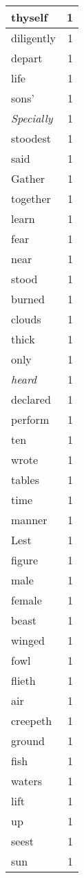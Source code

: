 \begin{center}
\begin{longtable}{l|r}
thyself & 1 \\ \hline
diligently & 1 \\ \hline
depart & 1 \\ \hline
life & 1 \\ \hline
sons' & 1 \\ \hline
\emph{Specially} & 1 \\ \hline
stoodest & 1 \\ \hline
said & 1 \\ \hline
Gather & 1 \\ \hline
together & 1 \\ \hline
learn & 1 \\ \hline
fear & 1 \\ \hline
near & 1 \\ \hline
stood & 1 \\ \hline
burned & 1 \\ \hline
clouds & 1 \\ \hline
thick & 1 \\ \hline
only & 1 \\ \hline
\emph{heard} & 1 \\ \hline
declared & 1 \\ \hline
perform & 1 \\ \hline
ten & 1 \\ \hline
wrote & 1 \\ \hline
tables & 1 \\ \hline
time & 1 \\ \hline
manner & 1 \\ \hline
Lest & 1 \\ \hline
figure & 1 \\ \hline
male & 1 \\ \hline
female & 1 \\ \hline
beast & 1 \\ \hline
winged & 1 \\ \hline
fowl & 1 \\ \hline
flieth & 1 \\ \hline
air & 1 \\ \hline
creepeth & 1 \\ \hline
ground & 1 \\ \hline
fish & 1 \\ \hline
waters & 1 \\ \hline
lift & 1 \\ \hline
up & 1 \\ \hline
seest & 1 \\ \hline
sun & 1 \\ \hline

\end{longtable}
\end{center}
